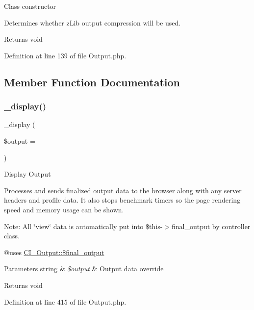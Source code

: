 Class constructor

Determines whether z\+Lib output compression will be used.

\begin{DoxyReturn}{Returns}
void 
\end{DoxyReturn}


Definition at line 139 of file Output.\+php.



\subsection{Member Function Documentation}
\mbox{\label{class_c_i___output_acc6949872b39347a6314db4bc8c45c50}} 
\subsubsection{\texorpdfstring{\_display()}{\_display()}}
{\footnotesize\ttfamily \+\_\+display (\begin{DoxyParamCaption}\item[{}]{\$output = {\ttfamily \textquotesingle{}\textquotesingle{}} }\end{DoxyParamCaption})}

Display Output

Processes and sends finalized output data to the browser along with any server headers and profile data. It also stops benchmark timers so the page rendering speed and memory usage can be shown.

Note\+: All \char`\"{}view\char`\"{} data is automatically put into \$this-\/$>$final\+\_\+output by controller class.

@uses \mbox{\hyperlink{class_c_i___output_aa1b5049c03b9ef373af010aa3cda17a3}{C\+I\+\_\+\+Output\+::\$final\+\_\+output}} 
\begin{DoxyParams}[1]{Parameters}
string & {\em \$output} & Output data override \\
\hline
\end{DoxyParams}
\begin{DoxyReturn}{Returns}
void 
\end{DoxyReturn}


Definition at line 415 of file Output.\+php.

\mbox{\label{class_c_i___output_acce78bdac02df9ab196a9c5939f6c4ab}} 
